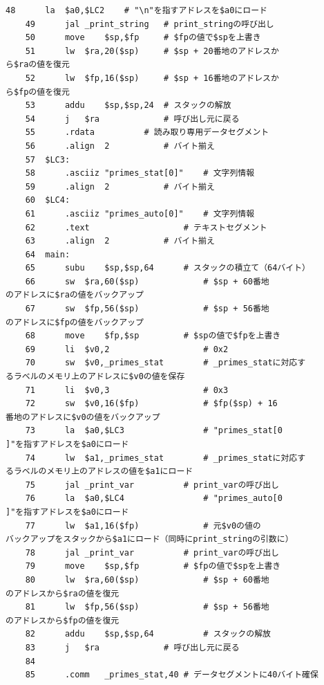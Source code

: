 \begin{Verbatim}[fontsize=\small, baselinestretch=0.8]
    48		la	$a0,$LC2	# "\n"を指すアドレスを$a0にロード
    49		jal	_print_string	# print_stringの呼び出し
    50		move	$sp,$fp		# $fpの値で$spを上書き
    51		lw	$ra,20($sp)		# $sp + 20番地のアドレスか
ら$raの値を復元
    52		lw	$fp,16($sp)		# $sp + 16番地のアドレスか
ら$fpの値を復元
    53		addu	$sp,$sp,24	# スタックの解放
    54		j	$ra				# 呼び出し元に戻る
    55		.rdata			# 読み取り専用データセグメント
    56		.align	2			# バイト揃え
    57	$LC3:
    58		.asciiz	"primes_stat[0]"	# 文字列情報
    59		.align	2			# バイト揃え
    60	$LC4:
    61		.asciiz	"primes_auto[0]"	# 文字列情報
    62		.text					# テキストセグメント
    63		.align	2			# バイト揃え
    64	main:
    65		subu	$sp,$sp,64		# スタックの積立て（64バイト）
    66		sw	$ra,60($sp)				# $sp + 60番地
のアドレスに$raの値をバックアップ
    67		sw	$fp,56($sp)				# $sp + 56番地
のアドレスに$fpの値をバックアップ
    68		move	$fp,$sp			# $spの値で$fpを上書き
    69		li	$v0,2					# 0x2
    70		sw	$v0,_primes_stat		# _primes_statに対応す
るラベルのメモリ上のアドレスに$v0の値を保存
    71		li	$v0,3					# 0x3
    72		sw	$v0,16($fp)				# $fp($sp) + 16
番地のアドレスに$v0の値をバックアップ
    73		la	$a0,$LC3				# "primes_stat[0
]"を指すアドレスを$a0にロード
    74		lw	$a1,_primes_stat		# _primes_statに対応す
るラベルのメモリ上のアドレスの値を$a1にロード
    75		jal	_print_var			# print_varの呼び出し
    76		la	$a0,$LC4				# "primes_auto[0
]"を指すアドレスを$a0にロード
    77		lw	$a1,16($fp)				# 元$v0の値の
バックアップをスタックから$a1にロード（同時にprint_stringの引数に）
    78		jal	_print_var			# print_varの呼び出し
    79		move	$sp,$fp			# $fpの値で$spを上書き
    80		lw	$ra,60($sp)				# $sp + 60番地
のアドレスから$raの値を復元
    81		lw	$fp,56($sp)				# $sp + 56番地
のアドレスから$fpの値を復元
    82		addu	$sp,$sp,64			# スタックの解放
    83		j	$ra				# 呼び出し元に戻る
    84	
    85		.comm	_primes_stat,40	# データセグメントに40バイト確保

\end{Verbatim}

